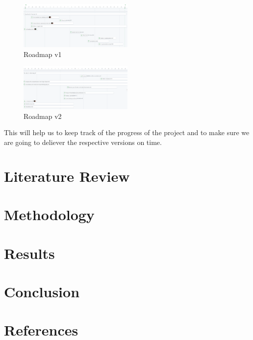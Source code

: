 \documentclass[12pt]{article}
\begin{document}
\begin{figure}[H]
    \centering
    \includegraphics[width=0.5\textwidth]{images/roadmap_v1.png}
    \caption{Roadmap v1}
\end{figure}

\begin{figure}[H]
    \centering
    \includegraphics[width=0.5\textwidth]{images/roadmap_v2.png}
    \caption{Roadmap v2}
\end{figure}

This will help us to keep track of the progress of the project and to make sure
we are going to deliever the respective versions on time.

\newpage
\section{Literature Review}

\newpage

\section{Methodology}

\newpage

\section{Results}

\newpage

\section{Conclusion}

\newpage

\section{References}
\nocite{*}


\end{document}
